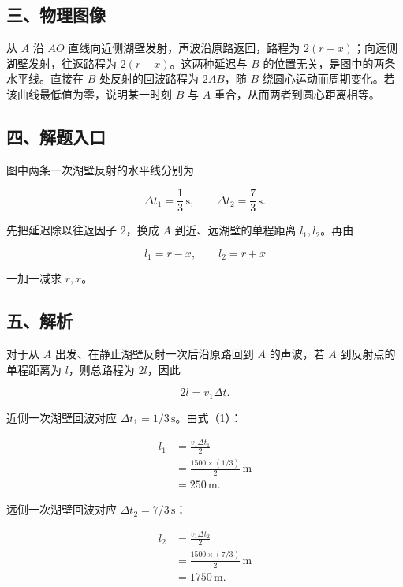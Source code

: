 \documentclass[12pt,a4paper,UTF8]{ctexart}
\begin{document}
\subsection{三、物理图像}\label{ux4e09ux7269ux7406ux56feux50cf-6}

从 \(A\) 沿 \(AO\) 直线向近侧湖壁发射，声波沿原路返回，路程为
\(2(r-x)\)；向远侧湖壁发射，往返路程为 \(2(r+x)\)。这两种延迟与 \(B\)
的位置无关，是图中的两条水平线。直接在 \(B\) 处反射的回波路程为
\(2AB\)，随 \(B\) 绕圆心运动而周期变化。若该曲线最低值为零，说明某一时刻
\(B\) 与 \(A\) 重合，从而两者到圆心距离相等。

\subsection{四、解题入口}\label{ux56dbux89e3ux9898ux5165ux53e3-6}

图中两条一次湖壁反射的水平线分别为

\[
\Delta t_1=\frac13\,\mathrm s,
\qquad
\Delta t_2=\frac73\,\mathrm s.
\]

先把延迟除以往返因子 \(2\)，换成 \(A\) 到近、远湖壁的单程距离
\(l_1,l_2\)。再由

\[
l_1=r-x,
\qquad
l_2=r+x
\]

一加一减求 \(r,x\)。

\subsection{五、解析}\label{ux4e94ux89e3ux6790-6}

对于从 \(A\) 出发、在静止湖壁反射一次后沿原路回到 \(A\) 的声波，若 \(A\)
到反射点的单程距离为 \(l\)，则总路程为 \(2l\)，因此

\[
2l=v_1\Delta t. \tag{1}
\]

近侧一次湖壁回波对应 \(\Delta t_1=1/3\,\mathrm s\)。由式（1）：

\[
\begin{aligned}
l_1
&=\frac{v_1\Delta t_1}{2}\\
&=\frac{1500\times(1/3)}{2}\,\mathrm m\\
&=250\,\mathrm m.
\end{aligned} \tag{2}
\]

远侧一次湖壁回波对应 \(\Delta t_2=7/3\,\mathrm s\)：

\[
\begin{aligned}
l_2
&=\frac{v_1\Delta t_2}{2}\\
&=\frac{1500\times(7/3)}{2}\,\mathrm m\\
&=1750\,\mathrm m.
\end{aligned} \tag{3}
\]
\end{document}
